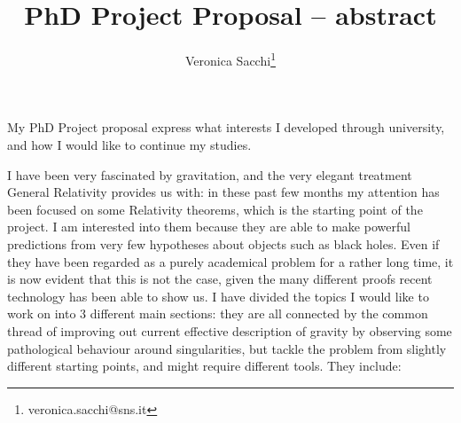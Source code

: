 \documentclass[12pt, a4paper]{article}
\title{PhD Project Proposal -- abstract}
\author{Veronica Sacchi\thanks{veronica.sacchi@sns.it}}
\begin{document}
\maketitle

My PhD Project proposal express what interests I developed through university, and how I would like to continue my studies. 

I have been very fascinated by gravitation, and the very elegant treatment General Relativity provides us with: in these past few months my attention has been focused on some Relativity theorems, which is the starting point of the project. 
I am interested into them because they are able to make powerful predictions from very few hypotheses about objects such as black holes. Even if they have been regarded as a purely academical problem for a rather long time, it is now evident that this is not the case, given the many different proofs recent technology has been able to show us.
I have divided the topics I would like to work on into \(3\) different main sections: they are all connected by the common thread of improving out current effective description of gravity by observing some pathological behaviour around singularities, but tackle the problem from slightly different starting points, and might require different tools. They include:
\end{document}
